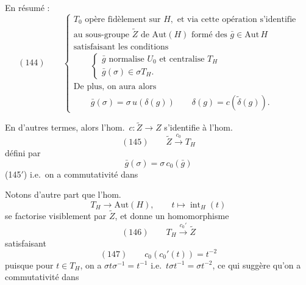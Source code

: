 \documentclass[11pt,a4paper]{article}
\begin{document}
En résumé :
\[
(144)\qquad
\left\{
\begin{array}{l}
T_0 \text{ opère fidèlement sur } H, \text{ et via cette opération s'identifie}\\
\text{au sous-groupe } \widetilde{Z} \text{ de } \mathrm{Aut}(H) \text{ formé des } \bar g\in\mathrm{Aut}\,H\\
\text{satisfaisant les conditions}\\
\qquad \begin{cases}
\bar g \text{ normalise } U_0 \text{ et centralise } T_H\\
\bar g(\sigma)\in\sigma T_H .
\end{cases}\\
\text{De plus, on aura alors}\\
\qquad \bar g(\sigma)=\sigma\,u(\delta(g)) \qquad \delta(g)=c(\tilde\delta(g)) .
\end{array}
\right.
\]

En d'autres termes, 
alors l'hom.\ $c\colon\widetilde{Z}\to Z$ s'identifie à l'hom.
\[
(145)\qquad \widetilde{Z}\xrightarrow{c_0}T_H
\]
défini par
\[
\bar g(\sigma)=\sigma\,c_0(\bar g)
\]
(145$'$) i.e.\ on a commutativité dans



Notons d'autre part que l'hom.
\[
T_H\longrightarrow\mathrm{Aut}(H),\qquad t\longmapsto \operatorname{int}_H(t)
\]
se factorise visiblement par $\widetilde{Z}$, et donne un homomorphisme
\[
(146)\qquad T_H\xrightarrow{c_0'}\widetilde{Z}
\]
satisfaisant
\[
(147)\qquad c_0(c_0'(t))=t^{-2}
\]
puisque pour $t\in T_H$, on a $\sigma t\sigma^{-1}=t^{-1}$ \struck{\ill{}} i.e.\
$t\sigma t^{-1}=\sigma t^{-2}$, ce qui suggère qu'on a commutativité dans
\end{document}
